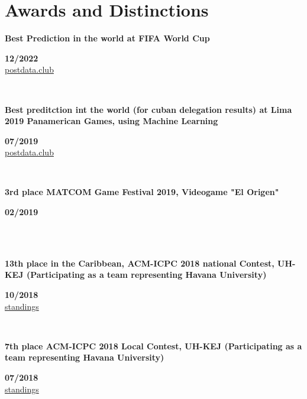 \documentclass{article}
\begin{document}
\section*{Awards and Distinctions}
\begin{minipage}{0.8\textwidth}
    \parbox{0.8\linewidth}{\textbf{Best Prediction in the world at FIFA World Cup}} \hfill \textbf{12/2022}\\
    \href{https://www.postdata.club/suplementos/mundial-qatar/pronosticando-qatar.html}{postdata.club}
    \\
\end{minipage} \hfill {}\\
\begin{minipage}{0.8\textwidth}
    \parbox{0.8\linewidth}{\textbf{Best preditction int the world (for cuban delegation results) at Lima 2019 Panamerican Games, using Machine Learning}} \hfill \textbf{07/2019}\\
    \href{http://www.postdata.club/issues/201907/el-medallero-de-lima-2019-que-se-puede-esperar.html}{postdata.club}
    \\
\end{minipage} \hfill {}\\
\begin{minipage}{0.8\textwidth}
    \parbox{0.8\linewidth}{\textbf{3rd place MATCOM Game Festival 2019, Videogame "El Origen"}} \hfill \textbf{02/2019}\\
    \\
\end{minipage}\\
\begin{minipage}{0.8\textwidth}
    \parbox{0.8\linewidth}{\textbf{13th place in the Caribbean, ACM-ICPC 2018 national Contest,  UH-KEJ (Participating as a team representing Havana University)}} \hfill \textbf{10/2018}\\
    \href{https://icpc.global/regionals/finder/cnc-2018/standings}{standings}
    \\
\end{minipage} \hfill {}\\
\begin{minipage}{0.8\textwidth}
    \parbox{0.8\linewidth}{\textbf{7th place ACM-ICPC 2018 Local Contest, UH-KEJ (Participating as a team representing Havana University)}} \hfill \textbf{07/2018}\\
    \href{https://matcomgrader.com/post/5179/resultados-del-concurso-local-caribeno-2018}{standings}
    \\
\end{minipage} \hfill {}\\
\end{document}
